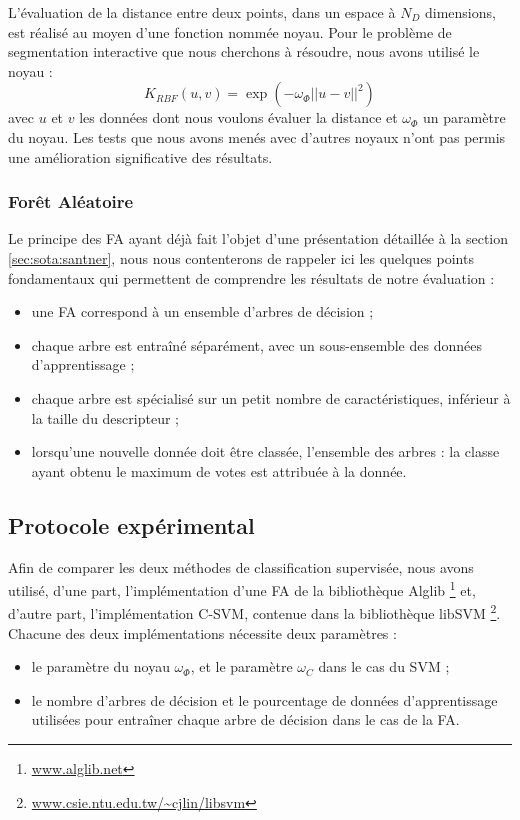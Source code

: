 L’évaluation de la distance entre deux points, dans un espace à $N_{D}$ dimensions, est réalisé au moyen d’une fonction nommée noyau. Pour le problème de segmentation interactive que nous cherchons à résoudre, nous avons utilisé le noyau  :
\begin{equation}
K_{RBF}(u,v) = \exp(- \omega_{\Phi} ||u-v||^{2}) 
\end{equation}
avec $u$ et $v$ les données dont nous voulons évaluer la distance et $\omega_{\Phi}$ un paramètre du noyau. Les tests que nous avons menés avec d'autres noyaux n'ont pas permis une amélioration significative des résultats. 


\subsubsection{Forêt Aléatoire}
Le principe des FA ayant déjà fait l'objet d'une présentation détaillée à la section \ref{sec:sota:santner}, nous nous contenterons de rappeler ici les quelques points fondamentaux qui permettent de comprendre les résultats de notre évaluation :
\begin{itemize}
\item une FA correspond à un ensemble d'arbres de décision ;
\item chaque arbre est entraîné séparément, avec un sous-ensemble des données d'apprentissage ;
\item chaque arbre est spécialisé sur un petit nombre de caractéristiques, inférieur à la taille du descripteur ;
\item lorsqu'une nouvelle donnée doit être classée, l'ensemble des arbres  : la classe ayant obtenu le maximum de votes est attribuée à la donnée. 
\end{itemize}



\subsection{Protocole expérimental}
Afin de comparer les deux méthodes de classification supervisée, nous avons utilisé, d'une part, l'implémentation d'une FA de la bibliothèque  Alglib  \footnote{\url{www.alglib.net}} et, d'autre part, l'implémentation C-SVM, contenue dans la bibliothèque  libSVM \footnote{\url{www.csie.ntu.edu.tw/~cjlin/libsvm}}. Chacune des deux implémentations nécessite deux  paramètres : 
\begin{itemize}
\item le paramètre du noyau\modif{,} $\omega_{\Phi}$, et le paramètre  $\omega_{C}$ dans le cas du SVM ;
\item  le nombre d'arbres de décision et  le pourcentage de données d'apprentissage utilisées pour entraîner chaque arbre de décision dans le cas de la FA.
\end{itemize}

